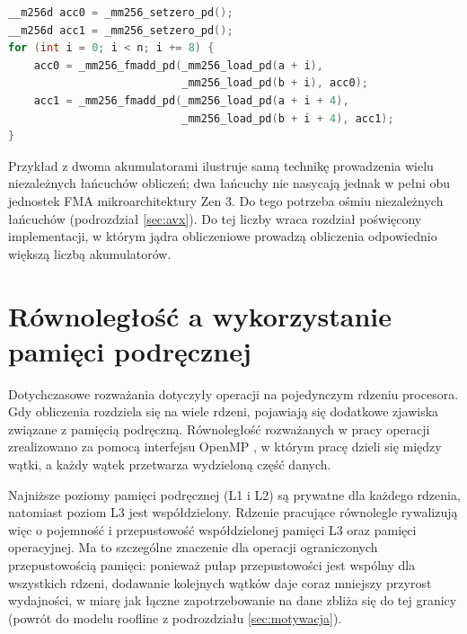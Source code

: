 \documentclass[a4paper,12pt]{book} %
\begin{document}
\begin{lstfloat}[t!]
\begin{lstlisting}[language=C, caption={Zwektoryzowana pętla z funkcjami wbudowanymi AVX2: każda instrukcja FMA przetwarza cztery wartości double naraz, a dwa niezależne akumulatory częściowo ukrywają latencję potoku}, label={lst:wektor}]
__m256d acc0 = _mm256_setzero_pd();
__m256d acc1 = _mm256_setzero_pd();
for (int i = 0; i < n; i += 8) {
    acc0 = _mm256_fmadd_pd(_mm256_load_pd(a + i),
                           _mm256_load_pd(b + i), acc0);
    acc1 = _mm256_fmadd_pd(_mm256_load_pd(a + i + 4),
                           _mm256_load_pd(b + i + 4), acc1);
}
\end{lstlisting}
\end{lstfloat}

Przykład z dwoma akumulatorami ilustruje samą technikę prowadzenia wielu niezależnych łańcuchów obliczeń; dwa łańcuchy nie nasycają jednak w pełni obu jednostek FMA mikroarchitektury Zen 3. Do tego potrzeba ośmiu niezależnych łańcuchów (podrozdział \ref{sec:avx}). Do tej liczby wraca rozdział poświęcony implementacji, w którym jądra obliczeniowe prowadzą obliczenia odpowiednio większą liczbą akumulatorów.

\section{Równoległość a wykorzystanie pamięci podręcznej}
\label{sec:rownoleglosc}

Dotychczasowe rozważania dotyczyły operacji na pojedynczym rdzeniu procesora. Gdy obliczenia rozdziela się na wiele rdzeni, pojawiają się dodatkowe zjawiska związane z pamięcią podręczną. Równoległość rozważanych w pracy operacji zrealizowano za pomocą interfejsu OpenMP \cite{openmp52}, w którym pracę dzieli się między wątki, a każdy wątek przetwarza wydzieloną część danych.

Najniższe poziomy pamięci podręcznej (L1 i L2) są prywatne dla każdego rdzenia, natomiast poziom L3 jest współdzielony. Rdzenie pracujące równolegle rywalizują więc o pojemność i przepustowość współdzielonej pamięci L3 oraz pamięci operacyjnej. Ma to szczególne znaczenie dla operacji ograniczonych przepustowością pamięci: ponieważ pułap przepustowości jest wspólny dla wszystkich rdzeni, dodawanie kolejnych wątków daje coraz mniejszy przyrost wydajności, w miarę jak łączne zapotrzebowanie na dane zbliża się do tej granicy (powrót do modelu roofline z podrozdziału \ref{sec:motywacja}).
\end{document}
